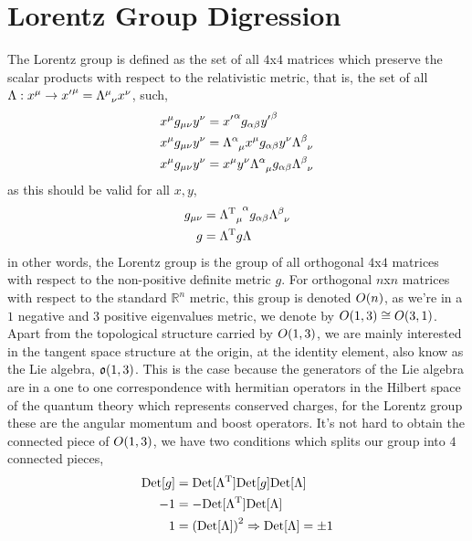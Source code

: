 \section{Lorentz Group Digression}

The Lorentz group is defined as the set of all $4$x$4$ matrices which preserve the scalar products 
with respect to the relativistic metric, that is, the set of all $\Lambda:x^\mu\rightarrow {x'}^\mu=\tensor{\Lambda}{^\mu_\nu}x^\nu$, 
such,
\begin{align}
    {x}^\mu g_{\mu\nu} {y}^\nu&={x'}^\alpha g_{\alpha\beta} {y'}^\beta\\
    {x}^\mu g_{\mu\nu} {y}^\nu&=\tensor{\Lambda}{^\alpha_\mu}{x}^\mu g_{\alpha\beta} {y}^\nu\tensor{\Lambda}{^\beta_\nu}\\
    {x}^\mu g_{\mu\nu} {y}^\nu&={x}^\mu {y}^\nu \tensor{\Lambda}{^\alpha_\mu}g_{\alpha\beta} \tensor{\Lambda}{^\beta_\nu}
\end{align}
as this should be valid for all $x,y$,
\begin{align}
     g_{\mu\nu} &= \tensor{{\Lambda^{\textnormal{T}}}}{_\mu^\alpha}g_{\alpha\beta} \tensor{\Lambda}{^\beta_\nu}\\
     g&=\Lambda^{\textnormal{T}}g\Lambda
\end{align}
in other words, the Lorentz group is the group of all orthogonal $4$x$4$ matrices with respect to the non-positive definite 
metric $g$. For orthogonal $n$x$n$ matrices with respect to the standard $\mathbb R^n$ metric, this group is denoted $O\qty(n)$, 
as we're in a $1$ negative and $3$ positive eigenvalues metric, we denote by $O\qty(1,3)\cong O\qty(3,1)$.
Apart from the topological structure carried by $O\qty(1,3)$, we are mainly interested in the tangent space structure at 
the origin, at the identity element, also know as the Lie algebra, $\mathfrak o\qty(1,3)$. This is the case because 
the generators of the Lie algebra are in a one to one correspondence with hermitian operators in the Hilbert space of 
the quantum theory which represents conserved charges, for the Lorentz group these are the angular momentum and boost 
operators. It's not hard to obtain the connected piece of $O\qty(1,3)$, we have two conditions which splits our group 
into $4$ connected pieces, 
\begin{align}
    \textup{Det} \qty[g]&=\textup{Det} [\Lambda^{\textnormal{T}}]\textup{Det} [g]\textup{Det} [\Lambda]\\
    -1&=-\textup{Det} [\Lambda^{\textnormal{T}}]\textup{Det} [\Lambda]\\
    1&=\qty(\textup{Det} [\Lambda])^2\Rightarrow \textup{Det} [\Lambda] =\pm 1
\end{align}
